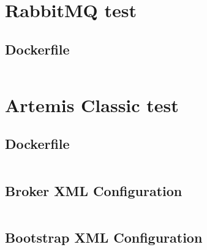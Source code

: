\section{RabbitMQ test}\label{sec:code_rabbitmq}

\subsection{Dockerfile}\label{sec:docker_rabbitmq}
\inputminted{python3}{../tests/messaging/rabbitmq-server/Dockerfile}


\section{Artemis Classic test}\label{sec:code_artemis}

\subsection{Dockerfile}\label{sec:docker_artemis}
\inputminted{python3}{../tests/messaging/artemis-server/Dockerfile}

\subsection{Broker XML Configuration}\label{sec:broker_artemis}
\inputminted{xml}{../tests/messaging/artemis-server/broker.xml}

\subsection{Bootstrap XML Configuration}\label{sec:bootstrap_artemis}
\inputminted{xml}{../tests/messaging/artemis-server/bootstrap.xml}
